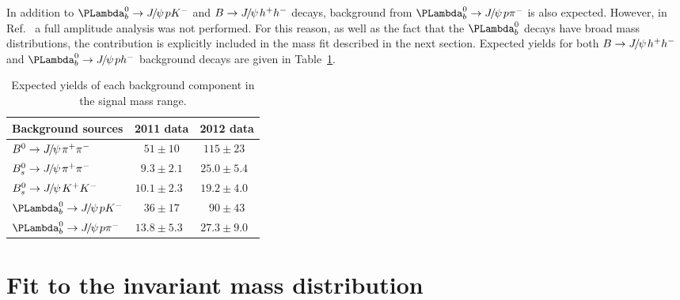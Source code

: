 \documentclass[12pt,a4paper]{article}
\def\PJ      {\ensuremath{J}\xspace}
\def\Ppsi {\ensuremath{\psi}\xspace}
\def\jpsi     {{\ensuremath{{\PJ\mskip -3mu/\mskip -2mu\Ppsi\mskip 2mu}}}\xspace}
\def\Jpsi     {{\ensuremath{\jpsi}}\xspace}
\newcommand{\Lambdab}{\ensuremath{\PLambda^0_b}\xspace}
\newcommand{\Lb}{\Lambdab}
\newcommand{\BJpsihh}{\ensuremath{B\to \jpsi h^+h^-}\xspace}
\newcommand{\BdJpsipipi}{\ensuremath{B^0\to \jpsi \pi^+\pi^-}\xspace}
\newcommand{\BsJpsipipi}{\ensuremath{B^0_s\to \jpsi \pi^+\pi^-}\xspace}
\newcommand{\BsJpsiKK}{\ensuremath{B^0_s\to \jpsi K^+K^-}\xspace}
\newcommand{\LbJpsipK}{\ensuremath{\Lambdab\to\Jpsi p K^-}\xspace}
\newcommand{\LbJpsippi}{\ensuremath{\Lambdab\to\Jpsi p \pi^-}\xspace}
\newcommand{\LbJpsiph}{\ensuremath{\Lambdab\to\Jpsi p h^-}\xspace}
\newcommand{\tabref}[1]{Table~\ref{#1}}
\begin{document}
In addition to \LbJpsipK and \BJpsihh decays, background from \LbJpsippi is also expected. 
However, in Ref.~\cite{LHCb-PAPER-2014-020} a full amplitude analysis was not performed. For this reason, as well as the fact that the \Lb decays have broad mass distributions, the contribution is explicitly included in the mass fit described in the next section. Expected yields for both \BJpsihh and \LbJpsiph background decays are given in \tabref{tab:peakingSummary}. 
\begin{table}
\begin{center}
\caption{Expected yields of each background component in the signal mass range.}
\begin{tabular}{l c c}
\hline
Background sources & 2011 data & 2012 data \\
\hline
\BdJpsipipi & $\phantom{0}51 \pm 10\phantom{0}$ & $115 \pm 23\phantom{0}$ \\
\BsJpsipipi & $\phantom{0}9.3 \pm 2.1\phantom{0}$ & $25.0\pm 5.4\phantom{0}$\\
\BsJpsiKK & $10.1 \pm 2.3\phantom{0}$ & $19.2 \pm 4.0\phantom{0}$ \\
\LbJpsipK & $\phantom{0}36 \pm 17\phantom{0}$ & $\phantom{0}90 \pm 43\phantom{0}$ \\
\LbJpsippi & $13.8 \pm 5.3\phantom{0}$ & $27.3 \pm 9.0\phantom{0}$ \\
\hline
\end{tabular}
\label{tab:peakingSummary}
\end{center}
\end{table}

\section{Fit to the invariant mass distribution}
\label{sec:sWeighting}
\end{document}

